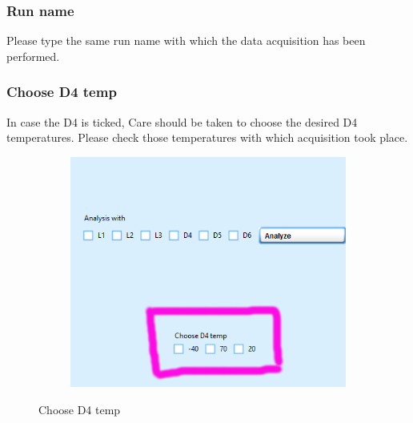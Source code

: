 \documentclass[12pt]{article}
\begin{document}
    
    
    
    
    
    
    
    
    
    
    
    
    
    
    
    
    
    
    
    
    
    
    
    \subsubsection{Run name}
     Please type the same run name with which the data acquisition has been performed. 
    
    \subsubsection{Choose D4 temp}
    In case the  D4 is ticked,  Care should be taken to choose the desired D4 temperatures. Please check those temperatures with which acquisition took place.
    
     \begin{figure}[H]
 
    \begin{subfigure}{1.0\textwidth}
    \includegraphics[scale=0.5]{images/choose_D4_temp.png} 
    \label{fig:DJp1}
    \end{subfigure}
 
 \caption{Choose D4 temp}
\label{fig6}
\end{figure}
     
\end{document}
